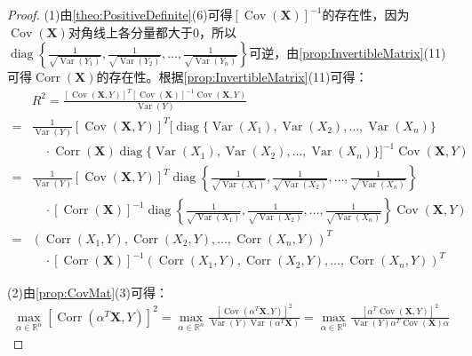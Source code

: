 \begin{proof}
	(1)由\cref{theo:PositiveDefinite}(6)可得$[\operatorname{Cov}(\mathbf{X})]^{-1}$的存在性，因为$\operatorname{Cov}(\mathbf{X})$对角线上各分量都大于$0$，所以$\operatorname{diag}\left\{\frac{1}{\sqrt{\operatorname{Var}(Y_1)}},\frac{1}{\sqrt{\operatorname{Var}(Y_2)}},\dots,\frac{1}{\sqrt{\operatorname{Var}(Y_n)}}\right\}$可逆，由\cref{prop:InvertibleMatrix}(11)可得$\operatorname{Corr}(\mathbf{X})$的存在性。根据\cref{prop:InvertibleMatrix}(11)可得：
	\begin{align*}
		&R^2=\frac{[\operatorname{Cov}(\mathbf{X},Y)]^T[\operatorname{Cov}(\mathbf{X})]^{-1}\operatorname{Cov}(\mathbf{X},Y)}{\operatorname{Var}(Y)} \\
		=&\frac{1}{\operatorname{Var}(Y)}[\operatorname{Cov}(\mathbf{X},Y)]^T[\operatorname{diag}\{\operatorname{Var}(X_1),\operatorname{Var}(X_2),\dots,\operatorname{Var}(X_n)\} \\
		&\quad\cdot\operatorname{Corr}(\mathbf{X})\operatorname{diag}\{\operatorname{Var}(X_1),\operatorname{Var}(X_2),\dots,\operatorname{Var}(X_n)\}]^{-1}\operatorname{Cov}(\mathbf{X},Y) \\
		=&\frac{1}{\operatorname{Var}(Y)}[\operatorname{Cov}(\mathbf{X},Y)]^T\operatorname{diag}\left\{\frac{1}{\sqrt{\operatorname{Var}(X_1)}},\frac{1}{\sqrt{\operatorname{Var}(X_2)}},\dots,\frac{1}{\sqrt{\operatorname{Var}(X_n)}}\right\} \\
		&\quad\cdot[\operatorname{Corr}(\mathbf{X})]^{-1}\operatorname{diag}\left\{\frac{1}{\sqrt{\operatorname{Var}(X_1)}},\frac{1}{\sqrt{\operatorname{Var}(X_2)}},\dots,\frac{1}{\sqrt{\operatorname{Var}(X_n)}}\right\}\operatorname{Cov}(\mathbf{X},Y) \\
		=&(\operatorname{Corr}(X_1,Y),\operatorname{Corr}(X_2,Y),\dots,\operatorname{Corr}(X_n,Y))^T \\
		&\quad\cdot[\operatorname{Corr}(\mathbf{X})]^{-1}(\operatorname{Corr}(X_1,Y),\operatorname{Corr}(X_2,Y),\dots,\operatorname{Corr}(X_n,Y))^T
	\end{align*}\par
	(2)由\cref{prop:CovMat}(3)可得：
	\begin{align*}
		\max_{\alpha\in\mathbb{R}^{n}}[\operatorname{Corr}(\alpha ^T\mathbf{X},Y)]^2=\max_{\alpha\in\mathbb{R}^{n}}\frac{[\operatorname{Cov}(\alpha^T\mathbf{X},Y)]^2}{\operatorname{Var}(Y)\operatorname{Var}(\alpha^T\mathbf{X})}=\max_{\alpha\in\mathbb{R}^{n}}\frac{[\alpha^T\operatorname{Cov}(\mathbf{X},Y)]^2}{\operatorname{Var}(Y)\alpha^T\operatorname{Cov}(\mathbf{X})\alpha}
	\end{align*}

\end{proof}
